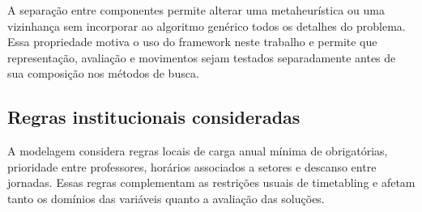 A separação entre componentes permite alterar uma metaheurística ou uma vizinhança sem incorporar ao algoritmo genérico todos os detalhes do problema. Essa propriedade motiva o uso do framework neste trabalho e permite que representação, avaliação e movimentos sejam testados separadamente antes de sua composição nos métodos de busca.

\subsection{Regras institucionais consideradas}
\label{subsec:diretrizes_institucionais}

A modelagem considera regras locais de carga anual mínima de obrigatórias, prioridade entre professores, horários associados a setores e descanso entre jornadas. Essas regras complementam as restrições usuais de timetabling e afetam tanto os domínios das variáveis quanto a avaliação das soluções.

